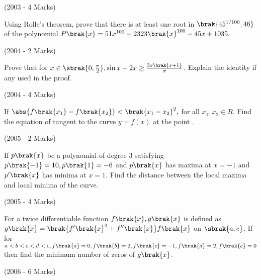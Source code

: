 \hfill{(2003 - 4 Marks)}\\

\item Using Rolle's theorem, prove that there is at least one root in $\brak{45^{1/100},46}$ of the polynomial 
$P\brak{x}=51x^{101}-2323\brak{x}^{100}-45x+1035.$

\hfill{(2004 - 2 Marks)}\\

\item Prove that for $x\in\sbrak{0,\frac{\pi}{2}}, \sin x+2x\geq \frac{3x\brak{x+1}}{\pi}$. Explain the identity if any used in the proof.

\hfill{(2004 - 4 Marks)}\\

\item If $\abs{f\brak{x_{1}}-f\brak{x_{2}}}<\brak{x_{1}-x_{2}}^{2},$ for all $x_{1},x_{2} \in R$. Find the equation of tangent to the curve $y=f(x)$ at the point .

\hfill{(2005 - 2 Marks)}\\

\item If $p\brak{x}$ be a polynomial of degree 3 satisfying $p\brak{-1}=10, p\brak{1}=-6$ and $p\brak{x}$ has maxima at $x=-1$ and $p^{\prime}\brak{x}$ has minima at $x=1$. Find the distance between the local maxima and local minima of the curve.

\hfill{(2005 - 4 Marks)}\\

\item For a twice differentiable function $f\brak{x}, g\brak{x}$ is defined as $g\brak{x}=\brak{f^{\prime}\brak{x}^{2}+f^{\prime\prime}\brak{x}} f\brak{x}$ on $\sbrak{a,e}$. If for $a<b<c<d<e, f\brak{a}=0,f\brak{b}=2,f\brak{c}=-1,f\brak{d}=2,f\brak{e}=0$ then find the minimum number of zeros of $g\brak{x}$.

\hfill{(2006 - 6 Marks)}\\  



